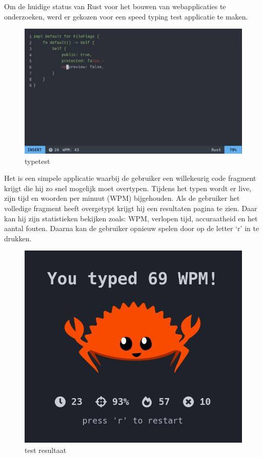 Om de huidige status van Rust voor het bouwen van webapplicaties te onderzoeken, werd er gekozen
voor een speed typing test applicatie te maken.

\begin{figure}[h]
  \centering
  \includegraphics[width=\textwidth]{./figures/vim.png}
  \caption{typetest}
\end{figure}

Het is een simpele applicatie waarbij de gebruiker een willekeurig code fragment krijgt die hij zo
snel mogelijk moet overtypen. Tijdens het typen wordt er live, zijn tijd en woorden per minuut (WPM)
bijgehouden. Als de gebruiker het volledige fragment heeft overgetypt krijgt hij een resultaten
pagina te zien. Daar kan hij zijn statistieken bekijken zoals: WPM, verlopen tijd, accuraatheid en
het aantal fouten. Daarna kan de gebruiker opnieuw spelen door op de letter ‘r’ in te drukken. \\
\begin{figure}
  \centering
  \includegraphics[width=\linewidth]{./figures/result.png}
  \caption{test resultaat}
\end{figure}



